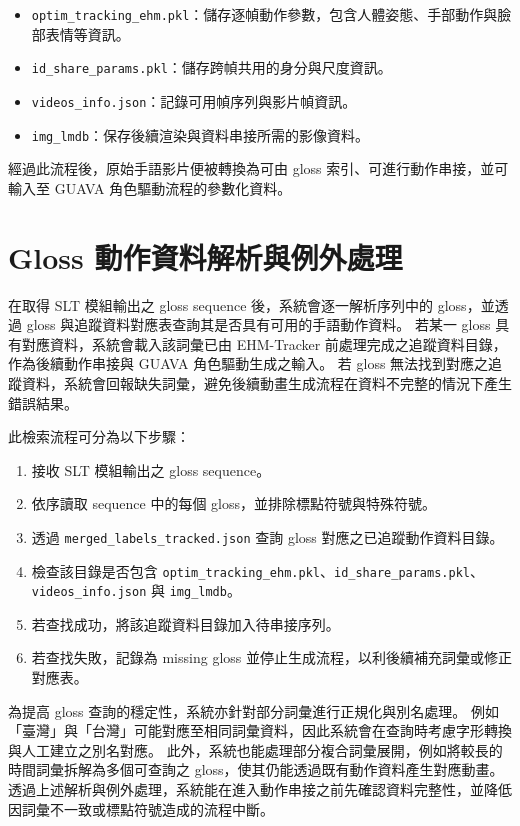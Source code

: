 \documentclass[class=NCU_thesis, crop=false]{standalone}
\begin{document}
\begin{itemize}
    \item \texttt{optim\_tracking\_ehm.pkl}：儲存逐幀動作參數，包含人體姿態、手部動作與臉部表情等資訊。
    \item \texttt{id\_share\_params.pkl}：儲存跨幀共用的身分與尺度資訊。
    \item \texttt{videos\_info.json}：記錄可用幀序列與影片幀資訊。
    \item \texttt{img\_lmdb}：保存後續渲染與資料串接所需的影像資料。
\end{itemize}

經過此流程後，原始手語影片便被轉換為可由 gloss 索引、可進行動作串接，並可輸入至 GUAVA 角色驅動流程的參數化資料。

\section{Gloss 動作資料解析與例外處理}
\label{sec:gloss_parsing_exception_handling}

在取得 SLT 模組輸出之 gloss sequence 後，系統會逐一解析序列中的 gloss，並透過 gloss 與追蹤資料對應表查詢其是否具有可用的手語動作資料。
若某一 gloss 具有對應資料，系統會載入該詞彙已由 EHM-Tracker 前處理完成之追蹤資料目錄，作為後續動作串接與 GUAVA 角色驅動生成之輸入。
若 gloss 無法找到對應之追蹤資料，系統會回報缺失詞彙，避免後續動畫生成流程在資料不完整的情況下產生錯誤結果。

此檢索流程可分為以下步驟：

\begin{enumerate}
    \item 接收 SLT 模組輸出之 gloss sequence。
    \item 依序讀取 sequence 中的每個 gloss，並排除標點符號與特殊符號。
    \item 透過 \texttt{merged\_labels\_tracked.json} 查詢 gloss 對應之已追蹤動作資料目錄。
    \item 檢查該目錄是否包含 \texttt{optim\_tracking\_ehm.pkl}、\texttt{id\_share\_params.pkl}、\texttt{videos\_info.json} 與 \texttt{img\_lmdb}。
    \item 若查找成功，將該追蹤資料目錄加入待串接序列。
    \item 若查找失敗，記錄為 missing gloss 並停止生成流程，以利後續補充詞彙或修正對應表。
\end{enumerate}

為提高 gloss 查詢的穩定性，系統亦針對部分詞彙進行正規化與別名處理。
例如「臺灣」與「台灣」可能對應至相同詞彙資料，因此系統會在查詢時考慮字形轉換與人工建立之別名對應。
此外，系統也能處理部分複合詞彙展開，例如將較長的時間詞彙拆解為多個可查詢之 gloss，使其仍能透過既有動作資料產生對應動畫。
透過上述解析與例外處理，系統能在進入動作串接之前先確認資料完整性，並降低因詞彙不一致或標點符號造成的流程中斷。
\end{document}

